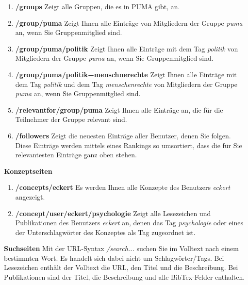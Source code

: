 \begin{enumerate}
    \item \textbf{/groups} \newline
    Zeigt alle Gruppen, die es in PUMA gibt, an.
    \item \textbf{/group/puma} \newline
    Zeigt Ihnen alle Einträge von Mitgliedern der Gruppe \textit{puma} an, wenn Sie Gruppenmitglied sind.
    \item \textbf{/group/puma/politik}\newline
    Zeigt Ihnen alle Einträge mit dem Tag \textit{politik} von Mitgliedern der Gruppe \textit{puma} an, wenn Sie Gruppenmitglied sind.
    \item \textbf{/group/puma/politik+menschnerechte}\newline
    Zeigt Ihnen alle Einträge mit dem Tag \textit{politik} und dem Tag \textit{menschenrechte} von Mitgliedern der Gruppe \textit{puma} an, wenn Sie Gruppenmitglied sind.
    \item \textbf{/relevantfor/group/puma} \newline
    Zeigt Ihnen alle Einträge an,  die für die Teilnehmer der Gruppe relevant sind.
    \item \textbf{/followers} \newline
    Zeigt die neuesten Einträge aller Benutzer, denen Sie folgen. Diese Einträge werden mittels eines Rankings so umsortiert, dass die für Sie relevantesten Einträge ganz oben stehen. 
\end{enumerate}
\textbf{Konzeptseiten}
\begin{enumerate}
    \item \textbf{/concepts/eckert} \newline
    Es werden Ihnen alle Konzepte des Benutzers \textit{eckert} angezeigt.
    \item \textbf{/concept/user/eckert/psychologie} \newline
    Zeigt alle Lesezeichen und Publikationen des Benutzers \textit{eckert} an, denen das Tag \textit{psychologie} oder eines der Unterschlagwörter des Konzeptes als Tag zugeordnet ist. 
\end{enumerate}
\textbf{Suchseiten}\newline
Mit der URL-Syntax \textit{/search...} suchen Sie im Volltext nach einem bestimmten Wort. Es handelt sich dabei nicht um Schlagwörter/Tags. Bei Lesezeichen enthält der Volltext die URL, den Titel und die Beschreibung. Bei Publikationen sind der Titel, die Beschreibung und alle BibTex-Felder enthalten.
